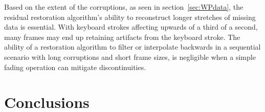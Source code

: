 Based on the extent of the corruptions, as seen in section~\ref{sec:WPdata}, the residual restoration algorithm's ability to reconstruct longer stretches of missing data is essential. With keyboard strokes affecting upwards of a third of a second, many frames may end up retaining artifacts from the keyboard stroke. The ability of a restoration algorithm to filter or interpolate backwards in a sequential scenario with long corruptions and short frame sizes, is negligible when a simple fading operation can mitigate discontinuities.


\section{Conclusions}



